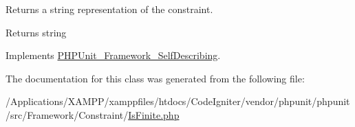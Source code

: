 Returns a string representation of the constraint.

\begin{DoxyReturn}{Returns}
string 
\end{DoxyReturn}


Implements \mbox{\hyperlink{interface_p_h_p_unit___framework___self_describing_a5558c5d549f41597377fa1ea8a1cefa3}{P\+H\+P\+Unit\+\_\+\+Framework\+\_\+\+Self\+Describing}}.



The documentation for this class was generated from the following file\+:\begin{DoxyCompactItemize}
\item 
/\+Applications/\+X\+A\+M\+P\+P/xamppfiles/htdocs/\+Code\+Igniter/vendor/phpunit/phpunit/src/\+Framework/\+Constraint/\mbox{\hyperlink{_is_finite_8php}{Is\+Finite.\+php}}\end{DoxyCompactItemize}
